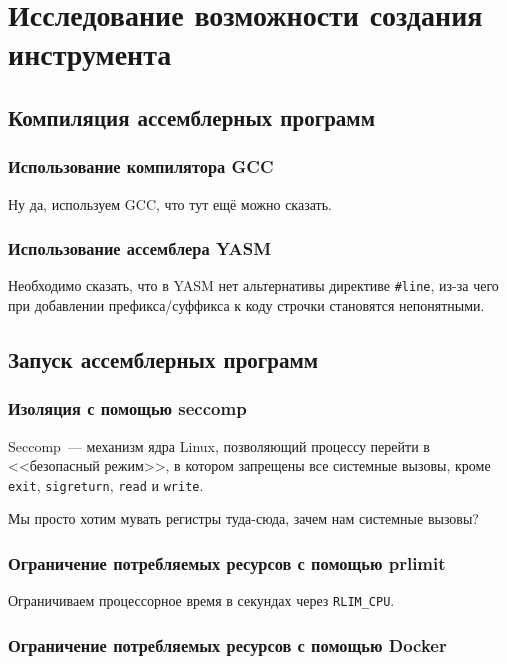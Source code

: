 \documentclass[a4paper,article,14pt]{extarticle}
\begin{document}
\section{Исследование возможности создания инструмента}

\subsection{Компиляция ассемблерных программ}

\subsubsection{Использование компилятора GCC}

Ну да, используем GCC, что тут ещё можно сказать.

\subsubsection{Использование ассемблера YASM}

Необходимо сказать, что в YASM нет альтернативы директиве \texttt{\#line}, из-за чего при добавлении префикса/суффикса к коду строчки становятся непонятными.

\subsection{Запуск ассемблерных программ}

\subsubsection{Изоляция с помощью seccomp}

Seccomp~--- механизм ядра Linux, позволяющий процессу перейти в <<безопасный режим>>, в котором запрещены все системные вызовы, кроме \texttt{exit}, \texttt{sigreturn}, \texttt{read} и \texttt{write}.

Мы просто хотим мувать регистры туда-сюда, зачем нам системные вызовы?

\subsubsection{Ограничение потребляемых ресурсов с помощью prlimit}

Ограничиваем процессорное время в секундах через \texttt{RLIM\_CPU}.

\subsubsection{Ограничение потребляемых ресурсов с помощью Docker}
\end{document}
